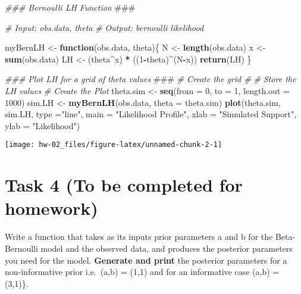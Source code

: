 \documentclass[
]{article}
\newenvironment{Shaded}{\begin{snugshade}}{\end{snugshade}}
\newcommand{\AlertTok}[1]{\textcolor[rgb]{0.94,0.16,0.16}{#1}}
\newcommand{\CommentTok}[1]{\textcolor[rgb]{0.56,0.35,0.01}{\textit{#1}}}
\newcommand{\ControlFlowTok}[1]{\textcolor[rgb]{0.13,0.29,0.53}{\textbf{#1}}}
\newcommand{\DataTypeTok}[1]{\textcolor[rgb]{0.13,0.29,0.53}{#1}}
\newcommand{\DecValTok}[1]{\textcolor[rgb]{0.00,0.00,0.81}{#1}}
\newcommand{\KeywordTok}[1]{\textcolor[rgb]{0.13,0.29,0.53}{\textbf{#1}}}
\newcommand{\NormalTok}[1]{#1}
\newcommand{\OperatorTok}[1]{\textcolor[rgb]{0.81,0.36,0.00}{\textbf{#1}}}
\newcommand{\StringTok}[1]{\textcolor[rgb]{0.31,0.60,0.02}{#1}}
\begin{document}
\begin{Shaded}
\begin{Highlighting}[]
\CommentTok{### Bernoulli LH Function }\AlertTok{###}

\CommentTok{# Input: obs.data, theta}
\CommentTok{# Output: bernoulli likelihood}

\NormalTok{myBernLH <-}\StringTok{ }\ControlFlowTok{function}\NormalTok{(obs.data, theta)\{}
\NormalTok{  N <-}\StringTok{ }\KeywordTok{length}\NormalTok{(obs.data)}
\NormalTok{  x <-}\StringTok{ }\KeywordTok{sum}\NormalTok{(obs.data)}
\NormalTok{  LH <-}\StringTok{ }\NormalTok{(theta}\OperatorTok{^}\NormalTok{x) }\OperatorTok{*}\StringTok{ }\NormalTok{((}\DecValTok{1}\OperatorTok{-}\NormalTok{theta)}\OperatorTok{^}\NormalTok{(N}\OperatorTok{-}\NormalTok{x))}
  \KeywordTok{return}\NormalTok{(LH)}
\NormalTok{\}}


\CommentTok{### Plot LH for a grid of theta values }\AlertTok{###}
\CommentTok{# Create the grid #}
\CommentTok{# Store the LH values}
\CommentTok{# Create the Plot}
\NormalTok{theta.sim <-}\StringTok{ }\KeywordTok{seq}\NormalTok{(}\DataTypeTok{from =} \DecValTok{0}\NormalTok{, }\DataTypeTok{to =} \DecValTok{1}\NormalTok{, }\DataTypeTok{length.out =} \DecValTok{1000}\NormalTok{)}
\NormalTok{sim.LH <-}\StringTok{ }\KeywordTok{myBernLH}\NormalTok{(obs.data, }\DataTypeTok{theta =}\NormalTok{ theta.sim)}
\KeywordTok{plot}\NormalTok{(theta.sim, sim.LH, }\DataTypeTok{type =}\StringTok{"line"}\NormalTok{, }\DataTypeTok{main =} \StringTok{"Likelihood Profile"}\NormalTok{, }\DataTypeTok{xlab =} \StringTok{"Simulated Support"}\NormalTok{, }\DataTypeTok{ylab =} \StringTok{"Likelihood"}\NormalTok{)}
\end{Highlighting}
\end{Shaded}

\begin{center}\texttt{[image: hw-02\_files/figure-latex/unnamed-chunk-2-1]} \end{center}

\hypertarget{task-4-to-be-completed-for-homework}{%
\section{Task 4 (To be completed for
homework)}\label{task-4-to-be-completed-for-homework}}

Write a function that takes as its inputs prior parameters \textsf{a}
and \textsf{b} for the Beta-Bernoulli model and the observed data, and
produces the posterior parameters you need for the model.
\textbf{Generate and print} the posterior parameters for a
non-informative prior i.e.~\textsf{(a,b) = (1,1)} and for an informative
case \textsf{(a,b) = (3,1)}\}.
\end{document}
